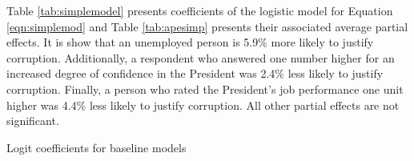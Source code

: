 \documentclass[12pt,a4]{article}\usepackage[]{graphicx}\usepackage[]{xcolor}
\begin{document}
Table \ref{tab:simplemodel} presents coefficients of the logistic model for Equation \ref{eqn:simplemod} and Table \ref{tab:apesimp} presents their associated average partial effects. It is show that an unemployed person is 5.9\% more likely to justify corruption. Additionally, a respondent who answered one number higher for an increased degree of confidence in the President was 2.4\% less likely to justify corruption. Finally, a person who rated the President's job performance one unit higher was 4.4\% less likely to justify corruption. All other partial effects are not significant.

\begin{table}[htbp!]
\caption{Logit coefficients for baseline models}
\label{tab:simplemodel}


\end{table}
\end{document}
